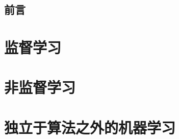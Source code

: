 \documentclass[oneside,12pt]{ctexbook}
\begin{document}
\cleardoublepage
\maketitle
\tableofcontents

\chapter*{前言}


\part{监督学习} %
\label{prt:监督学习_}
\clearpage








\part{非监督学习} %
\label{prt:非监督学习}





\part{独立于算法之外的机器学习} %
\label{prt:独立于算法之外的机器学习}




 
 
\end{document}
